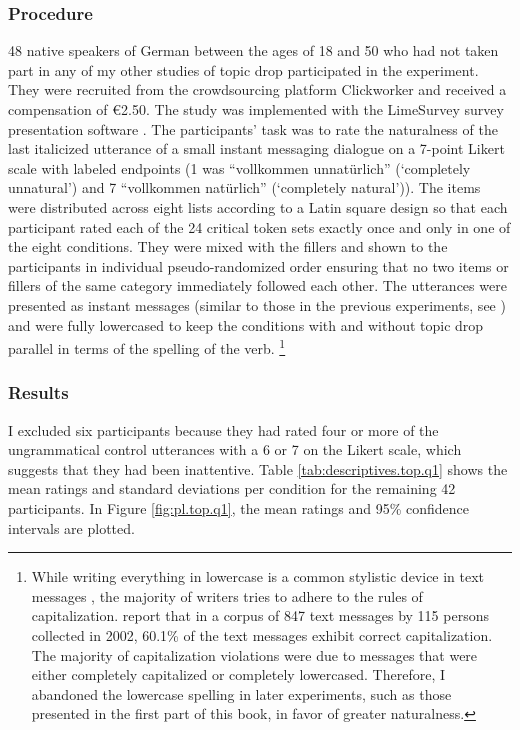 \subsubsection{Procedure}\label{sec:exp.top.q1.procedure}
48 native speakers of German between the ages of 18 and 50 who had not taken part in any of my other studies of topic drop participated in the experiment.
They were recruited from the crowdsourcing platform Clickworker \citep{clickworker2022} and received a compensation of €2.50.
The study was implemented with the LimeSurvey survey presentation software  \citep{limesurveygmbh}.
The participants' task was to rate the naturalness of the last italicized utterance of a small instant messaging dialogue on a 7-point Likert scale with labeled endpoints (1 was ``vollkommen unnatürlich'' (`completely unnatural') and 7 ``vollkommen natürlich'' (`completely natural')).
The items were distributed across eight lists according to a Latin square design so that each participant rated each of the 24 critical token sets exactly once and only in one of the eight conditions.
They were mixed with the fillers and shown to the participants in individual pseudo-randomized order ensuring that no two items or fillers of the same category immediately followed each other.
The utterances were presented as instant messages (similar to those in the previous experiments, see ) and were fully lowercased to keep the conditions with and without topic drop parallel in terms of the spelling of the verb.%
\footnote{While writing everything in lowercase is a common stylistic device in text messages \citep[152]{schnitzer2012}, the majority of writers tries to adhere to the rules of capitalization. 
\citet[15--16]{dittmann.etal2007} report that in a corpus  of 847 text messages by 115 persons collected in 2002, 60.1\% of the text messages exhibit correct capitalization.
The majority of capitalization violations were due to messages that were either completely capitalized or completely lowercased.
Therefore, I abandoned the lowercase spelling in later experiments, such as those presented in the first part of this book, in favor of greater naturalness.}
%


\subsubsection{Results}\label{sec:exp.top.q1.results}
I excluded six participants because they had rated four or more of the ungrammatical control utterances with a 6 or 7 on the Likert scale, which suggests that they had been inattentive.
Table \ref{tab:descriptives.top.q1} shows the mean ratings and standard deviations per condition for the remaining 42 participants.
In Figure \ref{fig:pl.top.q1}, the mean ratings and 95\% confidence intervals are plotted.

